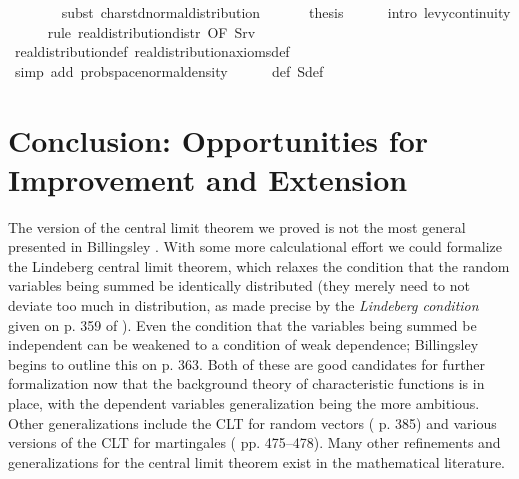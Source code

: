 \documentclass[leqno]{article}
\theoremstyle{definition}
\begin{document}
\begin{isabellebody}
\ \ \ \ \ \ \isamarkupfalse%
\ {\isacharparenleft}subst\ char{\isacharunderscore}std{\isacharunderscore}normal{\isacharunderscore}distribution{\isacharparenright}\isanewline
\ \ \isamarkupfalse%
\isanewline
\ \ \isamarkupfalse%
\ {\isacharquery}thesis\isanewline
\ \ \ \ \isamarkupfalse%
\ {\isacharparenleft}intro\ levy{\isacharunderscore}continuity{\isacharparenright}\isanewline
\ \ \ \ \isamarkupfalse%
\ {\isacharparenleft}rule\ real{\isacharunderscore}distribution{\isacharunderscore}distr\ {\isacharbrackleft}OF\ S{\isacharunderscore}rv{\isacharbrackright}{\isacharparenright}\isanewline
\ \ \ \ \isamarkupfalse%
\ real{\isacharunderscore}distribution{\isacharunderscore}def\ real{\isacharunderscore}distribution{\isacharunderscore}axioms{\isacharunderscore}def\isanewline
\ \ \ \ \isamarkupfalse%
\ {\isacharparenleft}simp\ add{\isacharcolon}\ prob{\isacharunderscore}space{\isacharunderscore}normal{\isacharunderscore}density{\isacharparenright}\isanewline
\ \ \ \ \isamarkupfalse%
\ {\isasymphi}{\isacharunderscore}def\ S{\isacharprime}{\isacharunderscore}def\ \isamarkupfalse%
\ {\isacharminus}\isanewline
{}
\end{isabellebody}

\section{Conclusion: Opportunities for Improvement and Extension}

The version of the central limit theorem we proved is not the most general presented in Billingsley \cite{billingsley}. With some more calculational effort we could formalize the Lindeberg central limit theorem, which relaxes the condition that the random variables being summed be identically distributed (they merely need to not deviate too much in distribution, as made precise by the {\em Lindeberg condition} given on p. 359 of \cite{billingsley}). Even the condition that the variables being summed be independent can be weakened to a condition of weak dependence; Billingsley begins to outline this on p. 363. Both of these are good candidates for further formalization now that the background theory of characteristic functions is in place, with the dependent variables generalization being the more ambitious. Other generalizations include the CLT for random vectors (\cite{billingsley} p. 385) and various versions of the CLT for martingales (\cite{billingsley} pp. 475--478). Many other refinements and generalizations for the central limit theorem exist in the mathematical literature.
\end{document}
